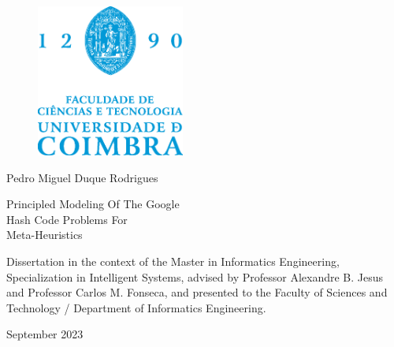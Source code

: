 \begin{cover}
  \vspace*{\fill}

  \begin{figure}[h!]
    \centering
    \includegraphics[height=5cm, keepaspectratio]{../assets/cover/fctuc-logo.eps}
  \end{figure}

  \vspace{\fill}

  \large{Pedro Miguel Duque Rodrigues}

  \vspace*{\fill}

  \LARGE{\sffamily Principled Modeling Of The Google \\ Hash Code Problems For \\ Meta-Heuristics}

  \vspace*{\fill}

  \normalsize{
    Dissertation in the context of the Master in Informatics Engineering,
    Specialization in Intelligent Systems, advised by Professor Alexandre B. Jesus
    and Professor Carlos M. Fonseca, and presented to the Faculty of
    Sciences and Technology / Department of Informatics Engineering.
  }

  \vspace{\fill}

  \normalsize{\centering September 2023}

  \vspace*{\fill}
\end{cover}